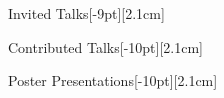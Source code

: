 \documentclass{cv} %
\begin{document}
%     

\begin{cvSection}{Invited Talks}[-9pt][2.1cm]
    
\end{cvSection}

\begin{cvSection}{Contributed Talks}[-10pt][2.1cm]
    
\end{cvSection}

\begin{cvSection}{Poster Presentations}[-10pt][2.1cm]
    
\end{cvSection}
\end{document}
